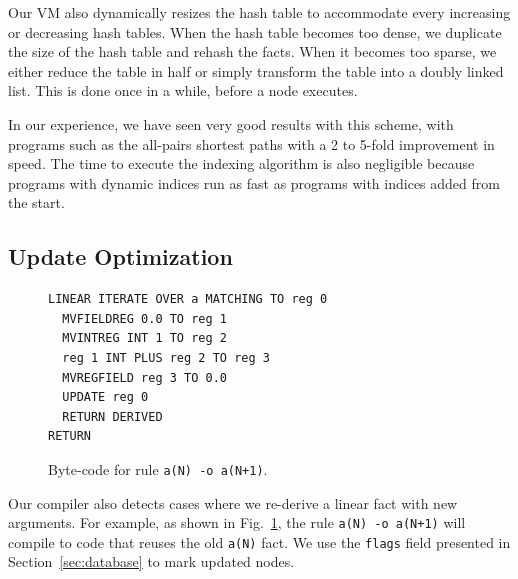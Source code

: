 Our VM also dynamically resizes the hash table to accommodate every increasing or decreasing hash tables. When the hash table becomes
too dense, we duplicate the size of the hash table and rehash the facts. When it becomes too sparse, we either reduce the table in half
or simply transform the table into a doubly linked list. This is done once in a while, before a node executes.

In our experience, we have seen very good results with this scheme, with programs such as the all-pairs shortest paths with a 2 to 5-fold
improvement in speed. The time to execute the indexing algorithm is also negligible because programs with dynamic indices run as fast
as programs with indices added from the start.

\subsection{Update Optimization}

\begin{figure}
\scriptsize\begin{Verbatim}
LINEAR ITERATE OVER a MATCHING TO reg 0
  MVFIELDREG 0.0 TO reg 1
  MVINTREG INT 1 TO reg 2
  reg 1 INT PLUS reg 2 TO reg 3
  MVREGFIELD reg 3 TO 0.0
  UPDATE reg 0
  RETURN DERIVED
RETURN
\end{Verbatim}
\caption{Byte-code for rule \texttt{a(N) -o a(N+1)}.}
\label{code:update}
\end{figure}

Our compiler also detects cases where we re-derive a linear fact with new arguments.
For example, as shown in Fig.~\ref{code:update}, the rule \texttt{a(N) -o a(N+1)}
will compile to code that reuses the old \texttt{a(N)} fact.
We use the \texttt{flags} field presented in Section~\ref{sec:database} to mark updated nodes.

